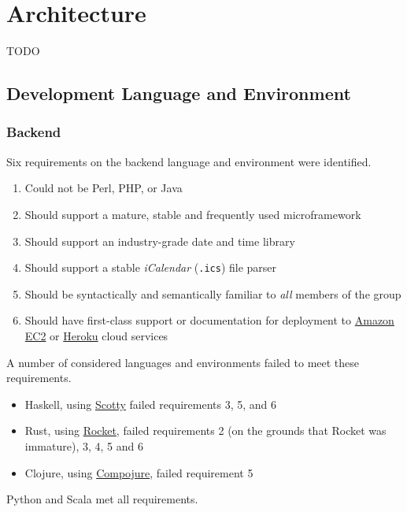 \documentclass[8pt,a4paper]{report}
\begin{document}
\chapter{Architecture}

TODO
\section{Development Language and Environment}

\subsection{Backend}

Six requirements on the backend language and environment were identified.

\begin{enumerate}
    \item Could not be Perl, PHP, or Java
    \item Should support a mature, stable and frequently used microframework
    \item Should support an industry-grade date and time library
    \item Should support a stable \textit{iCalendar} (\texttt{.ics}) file parser
    \item Should be syntactically and semantically familiar to \textit{all} members of the group
    \item Should have first-class support or documentation for deployment to \href{http://docs.aws.amazon.com/AWSEC2/latest/UserGuide/concepts.html}{Amazon EC2} or \href{https://www.heroku.com/}{Heroku} cloud services
 \end{enumerate}

A number of considered languages and environments failed to meet these requirements.

\begin{itemize}
    \item Haskell, using \href{https://github.com/scotty-web/scotty}{Scotty} failed requirements 3, 5, and 6
    \item Rust, using \href{https://rocket.rs/overview/}{Rocket}, failed requirements 2 (on the grounds that Rocket was immature), 3, 4, 5 and 6
    \item Clojure, using \href{https://github.com/weavejester/compojure}{Compojure}, failed requirement 5
\end{itemize}

Python and Scala met all requirements. 
\end{document}
